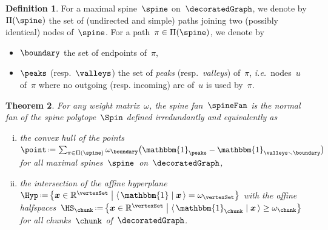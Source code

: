 \documentclass{amsart}
\newtheorem{theorem}{Theorem}[section]
\theoremstyle{definition}
\newtheorem{definition}[theorem]{Definition}
\newtheorem{example}[theorem]{Example}
\newcommand{\R}{\mathbb{R}} %
\renewcommand{\b}[1]{{\boldsymbol{#1}}} %
\newcommand{\bigset}[2]{\big\{ #1 \;\big|\; #2 \big\}} %
\newcommand{\ssm}{\smallsetminus} %
\newcommand{\dotprod}[2]{\langle \, #1 \; | \; #2 \, \rangle} %
\newcommand{\one}{\mathbbm{1}} %
\newcommand{\eqdef}{\mbox{\,\raisebox{0.2ex}{\scriptsize\ensuremath{\mathrm:}}\ensuremath{=}\,}} %
\newcommand{\ie}{\textit{i.e.}~} %
\newcommand{\darkblue}{\color{darkblue}} %
\newcommand{\defn}[1]{\textsl{\darkblue #1}} %
\newcommand{\vincent}[1]{\todo[color=blue!30]{#1 \\ \hfill --- V.}}
\newcommand{\weight}{\omega} %
\begin{document}
%
%

\begin{definition}
  For a maximal spine~$\spine$ on~$\decoratedGraph$, we denote by~$\Pi(\spine)$ the set of (undirected and simple) paths joining two (possibly identical) nodes of~$\spine$.
  For a path~$\pi \in \Pi(\spine)$, we denote by
  \begin{itemize}
    \item $\boundary$ the set of endpoints of~$\pi$, %
    \item $\peaks$ (resp.~$\valleys$) the set of \defn{peaks} (resp.~\defn{valleys}) of~$\pi$, \ie nodes~$u$ of~$\pi$ where no outgoing (resp. incoming) arc of~$u$ is used by~$\pi$.
  \end{itemize}
\end{definition}

\begin{theorem}
  \label{thm:permutreehedra}
  For any weight matrix~$\weight$, the spine fan~$\spineFan$ is the normal fan of the \defn{spine polytope}~$\Spin$ defined irredundantly and equivalently as
  \begin{enumerate}[(i)]
    \item the convex hull of the points~$\point \eqdef \sum_{\pi \in \Pi(\spine)} \weight_{\boundary} \big( \one_{\peaks} - \one_{\valleys \ssm \boundary} \big)$ for all maximal spines~$\spine$~on~$\decoratedGraph$,
    \item the intersection of the affine hyperplane~$\Hyp \eqdef \bigset{\b{x} \in \R^{\vertexSet}}{\dotprod{\one}{\b{x}} = \weight_{\vertexSet}}$ with the affine halfspaces~$\HS_{\chunk} \eqdef \bigset{\b{x} \in \R^{\vertexSet}}{\dotprod{\one_{\chunk}}{\b{x}} \ge \weight_{\chunk}}$ for all chunks~$\chunk$ of~$\decoratedGraph$.
  \end{enumerate}
\end{theorem}
\end{document}
